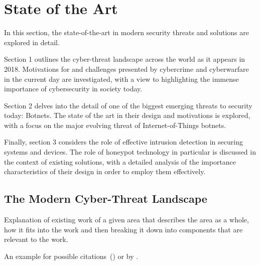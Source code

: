 \chapter{State of the Art}

In this section, the state-of-the-art in modern security threats and solutions are explored in detail.

Section 1 outlines the cyber-threat landscape across the world as it appears in 2018. Motivations for and challenges presented by cybercrime and cyberwarfare in the current day are investigated, with a view to highlighting the immense importance of cybersecurity in society today.

Section 2 delves into the detail of one of the biggest emerging threats to security today: Botnets. The state of the art in their design and motivations is explored, with a focus on the major evolving threat of Internet-of-Things botnets.

Finally, section 3 considers the role of effective intrusion detection in securing systems and devices. The role of honeypot technology in particular is discussed in the context of existing solutions, with a detailed analysis of the importance characteristics of their design in order to employ them effectively.



\section{The Modern Cyber-Threat Landscape}

Explanation of existing work of a given area that describes the area as a whole, how it fits into the work and then breaking it down into components that are relevant to the work.

An example for possible citations~(\cite{Andrew2013empirical}) or by \cite{Asghari2015Economics}.

